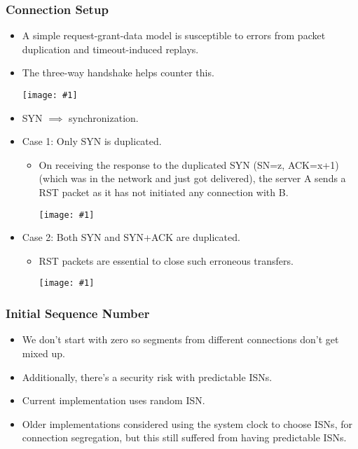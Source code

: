 \documentclass{report}
\makeatletter
\def\maxwidth#1{\ifdim\Gin@nat@width>#1 #1\else\Gin@nat@width\fi}
\newcommand{\mygraphic}[1]{
\begin{center}
    \texttt{[image: \#1]}
\end{center}
}
\makeatother
\begin{document}
\subsubsection{Connection Setup}
\begin{itemize}
\item A simple request-grant-data model is susceptible to errors from packet duplication and timeout-induced replays.
\item The three-way handshake helps counter this.
\mygraphic{rsrc/tcp3way.png}
\item SYN $\implies$ synchronization.
\item Case 1: Only SYN is duplicated.
\begin{itemize}
\item On receiving the response to the duplicated SYN (SN=z, ACK=x+1) (which was in the network and just got delivered), the server A sends a RST packet as it has not initiated any connection with B. 
\mygraphic{rsrc/tcp3waycase1.png}
\end{itemize}
\item Case 2: Both SYN and SYN+ACK are duplicated.
\begin{itemize}
\item RST packets are essential to close such erroneous transfers.
\mygraphic{rsrc/tcp3waycase2.png}
\end{itemize}
\end{itemize}
\subsubsection{Initial Sequence Number}
\begin{itemize}
\item We don't start with zero so segments from different connections don't get mixed up.
\item Additionally, there's a security risk with predictable ISNs.
\item Current implementation uses random ISN.
\item Older implementations considered using the system clock to choose ISNs, for connection segregation, but this still suffered from having predictable ISNs.
\end{itemize}
\end{document}
